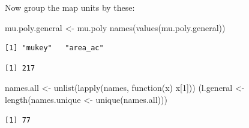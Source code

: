 \documentclass[
  letterpaper,
  DIV=11,
  numbers=noendperiod]{scrartcl}
\newenvironment{Shaded}{\begin{snugshade}}{\end{snugshade}}
\newcommand{\CommentTok}[1]{\textcolor[rgb]{0.37,0.37,0.37}{#1}}
\newcommand{\ControlFlowTok}[1]{\textcolor[rgb]{0.00,0.23,0.31}{#1}}
\newcommand{\DecValTok}[1]{\textcolor[rgb]{0.68,0.00,0.00}{#1}}
\newcommand{\FunctionTok}[1]{\textcolor[rgb]{0.28,0.35,0.67}{#1}}
\newcommand{\NormalTok}[1]{\textcolor[rgb]{0.00,0.23,0.31}{#1}}
\newcommand{\OtherTok}[1]{\textcolor[rgb]{0.00,0.23,0.31}{#1}}
\newcommand{\SpecialCharTok}[1]{\textcolor[rgb]{0.37,0.37,0.37}{#1}}
\begin{document}
Now group the map units by these:

\begin{Shaded}
\begin{Highlighting}[]
\NormalTok{mu.poly.general }\OtherTok{\textless{}{-}}\NormalTok{ mu.poly}
\FunctionTok{names}\NormalTok{(}\FunctionTok{values}\NormalTok{(mu.poly.general))}
\end{Highlighting}
\end{Shaded}

\begin{verbatim}
[1] "mukey"   "area_ac"
\end{verbatim}

\begin{Shaded}
\end{Shaded}

\begin{verbatim}
[1] 217
\end{verbatim}

\begin{Shaded}
\begin{Highlighting}[]
\NormalTok{names.all }\OtherTok{\textless{}{-}} \FunctionTok{unlist}\NormalTok{(}\FunctionTok{lapply}\NormalTok{(names, }\ControlFlowTok{function}\NormalTok{(x) x[}\DecValTok{1}\NormalTok{]))}
\NormalTok{(l.general }\OtherTok{\textless{}{-}} \FunctionTok{length}\NormalTok{(names.unique }\OtherTok{\textless{}{-}} \FunctionTok{unique}\NormalTok{(names.all)))}
\end{Highlighting}
\end{Shaded}

\begin{verbatim}
[1] 77
\end{verbatim}

\begin{Shaded}
\end{Shaded}
\end{document}
